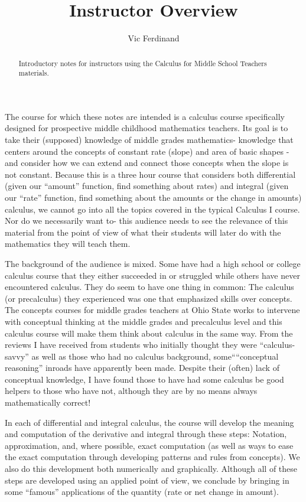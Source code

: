 \documentclass{ximera}
\author{Vic Ferdinand}
\title{Instructor Overview}
\begin{document}
\begin{abstract}
    Introductory notes for instructors using the Calculus for Middle School Teachers materials.
\end{abstract}
\maketitle


The course for which these notes are intended is a calculus course specifically designed for prospective middle childhood mathematics teachers.  Its goal is to take their (supposed) knowledge of middle grades mathematics- knowledge that centers around the concepts of constant rate (slope) and area of basic shapes - and consider how we can extend and connect those concepts when the slope is not constant.  Because this is a three hour course that considers both differential (given our ``amount'' function, find something about rates) and integral (given our ``rate'' function, find something about the amounts or the change in amounts) calculus, we cannot go into all the topics covered in the typical Calculus I course.  Nor do we necessarily want to- this audience needs to see the relevance of this material from the point of view of what their students will later do with the mathematics they will teach them. 

The background of the audience is mixed.  Some have had a high school or college calculus course that they either succeeded in or struggled while others have never encountered calculus.  They do seem to have one thing in common:  The calculus (or precalculus) they experienced was one that emphasized skills over concepts.  The concepts courses for middle grades teachers at Ohio State works to intervene with conceptual thinking at the middle grades and precalculus level and this calculus course will make them think about calculus in the same way.  From the reviews I have received from students who initially thought they were ``calculus-savvy'' as well as those who had no calculus background, some``“conceptual reasoning'' inroads have apparently been made. 
Despite their (often) lack of conceptual knowledge, I have found those to have had some calculus be good helpers to those who have not, although they are by no means always mathematically correct!

In each of differential and integral calculus, the course will develop the meaning and computation of the derivative and integral through these steps:  Notation, approximation, and, where possible, exact computation (as well as ways to ease the exact computation through developing patterns and rules from concepts).  We also do this development both numerically and graphically.  Although all of these steps are developed using an applied point of view, we conclude by bringing in some ``famous'' applications of the quantity (rate or net change in amount).
\end{document}
